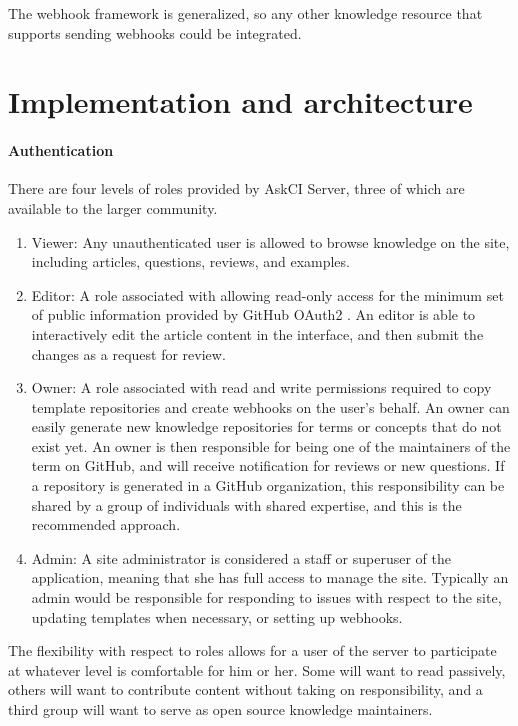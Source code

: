 \documentclass{jors}
\begin{document}
The webhook framework is generalized, so any other knowledge resource that supports sending webhooks could be integrated.

\section*{Implementation and architecture}
\thispagestyle{empty} 

\paragraph{Authentication}
There are four levels of roles provided by AskCI Server, three of which are available to the larger community.

\begin{enumerate}
\item Viewer: Any unauthenticated user is allowed to browse knowledge on the site, including articles, questions, reviews, and examples.
\item Editor: A role associated with allowing read-only access for the minimum set of public information provided by GitHub OAuth2 \cite{github-oauth2}. An editor is able to interactively edit the article content in the interface, and then submit the changes as a request for review.
\item Owner: A role associated with read and write permissions required to copy template repositories and create webhooks on the user's behalf. An owner can easily generate new knowledge repositories for terms or concepts that do not exist yet. An owner is then responsible for being one of the maintainers of the term on GitHub, and will receive notification for reviews or new questions. If a repository is generated in a GitHub organization, this responsibility can be shared by a group of individuals with shared expertise, and this is the recommended approach.
 \item Admin: A site administrator is considered a staff or superuser of the application, meaning that she has full access to manage the site. Typically an admin would be responsible for responding to issues with respect to the site, updating templates when necessary, or setting up webhooks.
 \end{enumerate}

The flexibility with respect to roles allows for a user of the server to participate at whatever level is comfortable for him or her. Some will want to read passively, others will want to contribute content without taking on responsibility, and a third group will want to serve as open source knowledge maintainers.
\end{document}
